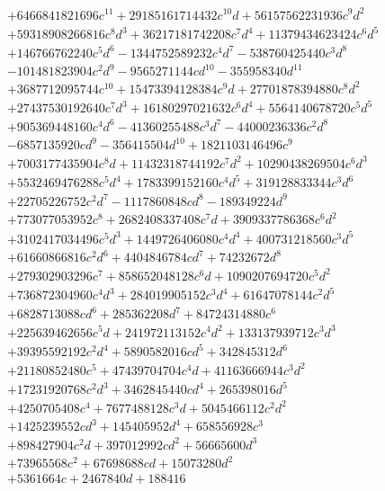 {\begin{align*}
&+6466841821696c^{11}+29185161714432c^{10}d+56157562231936c^{9}d^{2}\\
&+59318908266816c^{8}d^{3}+36217181742208c^{7}d^{4}+11379434623424c^{6}d^{5}\\
&+146766762240c^{5}d^{6}-1344752589232c^{4}d^{7}-538760425440c^{3}d^{8}\\
&-101481823904c^{2}d^{9}-9565271144cd^{10}-355958340d^{11}\\
&+3687712095744c^{10}+15473394128384c^{9}d+27701878394880c^{8}d^{2}\\
&+27437530192640c^{7}d^{3}+16180297021632c^{6}d^{4}+5564140678720c^{5}d^{5}\\
&+905369448160c^{4}d^{6}-41360255488c^{3}d^{7}-44000236336c^{2}d^{8}\\
&-6857135920cd^{9}-356415504d^{10}+1821103146496c^{9}\\
&+7003177435904c^{8}d+11432318744192c^{7}d^{2}+10290438269504c^{6}d^{3}\\
&+5532469476288c^{5}d^{4}+1783399152160c^{4}d^{5}+319128833344c^{3}d^{6}\\
&+22705226752c^{2}d^{7}-1117860848cd^{8}-189349224d^{9}\\
&+773077053952c^{8}+2682408337408c^{7}d+3909337786368c^{6}d^{2}\\
&+3102417034496c^{5}d^{3}+1449726406080c^{4}d^{4}+400731218560c^{3}d^{5}\\
&+61660866816c^{2}d^{6}+4404846784cd^{7}+74232672d^{8}\\
&+279302903296c^{7}+858652048128c^{6}d+1090207694720c^{5}d^{2}\\
&+736872304960c^{4}d^{3}+284019905152c^{3}d^{4}+61647078144c^{2}d^{5}\\
&+6828713088cd^{6}+285362208d^{7}+84724314880c^{6}\\
&+225639462656c^{5}d+241972113152c^{4}d^{2}+133137939712c^{3}d^{3}\\
&+39395592192c^{2}d^{4}+5890582016cd^{5}+342845312d^{6}\\
&+21180852480c^{5}+47439704704c^{4}d+41163666944c^{3}d^{2}\\
&+17231920768c^{2}d^{3}+3462845440cd^{4}+265398016d^{5}\\
&+4250705408c^{4}+7677488128c^{3}d+5045466112c^{2}d^{2}\\
&+1425239552cd^{3}+145405952d^{4}+658556928c^{3}\\
&+898427904c^{2}d+397012992cd^{2}+56665600d^{3}\\
&+73965568c^{2}+67698688cd+15073280d^{2}\\
&+5361664c+2467840d+188416
\end{align*}
}

